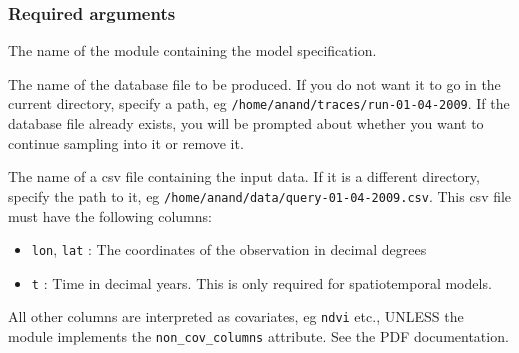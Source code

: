 \subsubsection{Required arguments%
}
\begin{list}{.}
{
\setlength{\rightmargin}{\leftmargin}
}

\item The name of the module containing the model specification.

\item The name of the database file to be produced. If you do not want it to go in the current
directory, specify a path, eg \texttt{/home/anand/traces/run-01-04-2009}. If the database file
already exists, you will be prompted about whether you want to continue sampling into it
or remove it.

\item The name of a csv file containing the input data. If it is a different directory, specify
the path to it, eg \texttt{/home/anand/data/query-01-04-2009.csv}. This csv file must have the
following columns:
%
\begin{itemize}

\item \texttt{lon}, \texttt{lat} : The coordinates of the observation in decimal degrees

\item \texttt{t} : Time in decimal years. This is only required for spatiotemporal models.

\end{itemize}

All other columns are interpreted as covariates, eg \texttt{ndvi} etc., UNLESS the module
implements the \texttt{non\_cov\_columns} attribute. See the PDF documentation.
\end{list}




